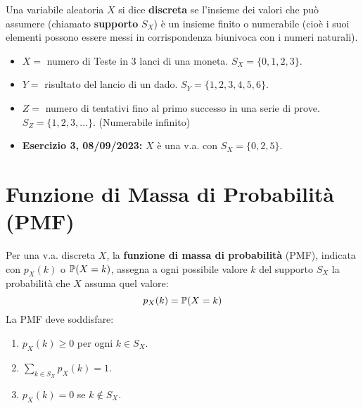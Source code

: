 \documentclass[12pt,a4paper]{article}
\begin{document}
\begin{example}
\begin{definition}
Una variabile aleatoria $X$ si dice \textbf{discreta} se l'insieme dei valori che può assumere (chiamato \textbf{supporto} $S_X$) è un insieme finito o numerabile (cioè i suoi elementi possono essere messi in corrispondenza biunivoca con i numeri naturali).
\end{definition}

\begin{example}
\begin{itemize}
    \item $X = $ numero di Teste in 3 lanci di una moneta. $S_X = \{0, 1, 2, 3\}$.
    \item $Y = $ risultato del lancio di un dado. $S_Y = \{1, 2, 3, 4, 5, 6\}$.
    \item $Z = $ numero di tentativi fino al primo successo in una serie di prove. $S_Z = \{1, 2, 3, \dots\}$. (Numerabile infinito)
    \item \textbf{Esercizio 3, 08/09/2023:} $X$ è una v.a. con $S_X = \{0, 2, 5\}$.
\end{itemize}
\end{example}

\section{Funzione di Massa di Probabilità (PMF)}
\begin{definition}
Per una v.a. discreta $X$, la \textbf{funzione di massa di probabilità} (PMF), indicata con $p_X(k)$ o $\mathbb{P}(X=k)$, assegna a ogni possibile valore $k$ del supporto $S_X$ la probabilità che $X$ assuma quel valore:
\[ p_X(k) = \mathbb{P}(X=k) \]
La PMF deve soddisfare:
\begin{enumerate}
    \item $p_X(k) \ge 0$ per ogni $k \in S_X$.
    \item $\sum_{k \in S_X} p_X(k) = 1$.
    \item $p_X(k) = 0$ se $k \notin S_X$.
\end{enumerate}
\end{definition}


\end{example}
\end{document}
